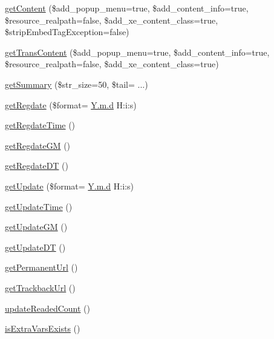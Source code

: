 \begin{DoxyCompactItemize}
\hyperlink{classdocumentItem_ab93870c122bc952a206f3c64ced3aa9e}{get\+Content} (\$add\+\_\+popup\+\_\+menu=true, \$add\+\_\+content\+\_\+info=true, \$resource\+\_\+realpath=false, \$add\+\_\+xe\+\_\+content\+\_\+class=true, \$strip\+Embed\+Tag\+Exception=false)
\item 
\hyperlink{classdocumentItem_a3143f575cb788ed2317b5697768a6a6f}{get\+Trans\+Content} (\$add\+\_\+popup\+\_\+menu=true, \$add\+\_\+content\+\_\+info=true, \$resource\+\_\+realpath=false, \$add\+\_\+xe\+\_\+content\+\_\+class=true)
\item 
\hyperlink{classdocumentItem_ae79665f63d15ecaeb114d32f1ef37256}{get\+Summary} (\$str\+\_\+size=50, \$tail= \textquotesingle{}...\textquotesingle{})
\item 
\hyperlink{classdocumentItem_af648c02eaaf148c374a7bfcdd968ff92}{get\+Regdate} (\$format= \textquotesingle{}\hyperlink{xpresseditor_8min_8js_aa27188e30a5d2270a230edf44af69623}{Y.\+m.\+d} H\+:i\+:s\textquotesingle{})
\item 
\hyperlink{classdocumentItem_ac5d8db0250cc8f448d9a76aaa3afa953}{get\+Regdate\+Time} ()
\item 
\hyperlink{classdocumentItem_a7bd6f9adea145314a87c95b13f6e0bd7}{get\+Regdate\+GM} ()
\item 
\hyperlink{classdocumentItem_a30f4ec669361717a82e5dee9c9b3868f}{get\+Regdate\+DT} ()
\item 
\hyperlink{classdocumentItem_acdd6ff630a1cc11f2d664fdec740ae0c}{get\+Update} (\$format= \textquotesingle{}\hyperlink{xpresseditor_8min_8js_aa27188e30a5d2270a230edf44af69623}{Y.\+m.\+d} H\+:i\+:s\textquotesingle{})
\item 
\hyperlink{classdocumentItem_a026c6426bea71f9ab86a4f4a7dcff6d9}{get\+Update\+Time} ()
\item 
\hyperlink{classdocumentItem_a6bb6ee1c20e63af811ebd2c6993e898f}{get\+Update\+GM} ()
\item 
\hyperlink{classdocumentItem_a05139ae1f3934a4db14e4d73b504f534}{get\+Update\+DT} ()
\item 
\hyperlink{classdocumentItem_a8583e18888f4ad634ec23c7cd85dc172}{get\+Permanent\+Url} ()
\item 
\hyperlink{classdocumentItem_a38db599ef3ca4f789475d7e8cceb13da}{get\+Trackback\+Url} ()
\item 
\hyperlink{classdocumentItem_ac268c88d87f12155e5885510213028e3}{update\+Readed\+Count} ()
\item 
\hyperlink{classdocumentItem_ac51058096d79221c90595564e3dbdb82}{is\+Extra\+Vars\+Exists} ()
\item 

\end{DoxyCompactItemize}
